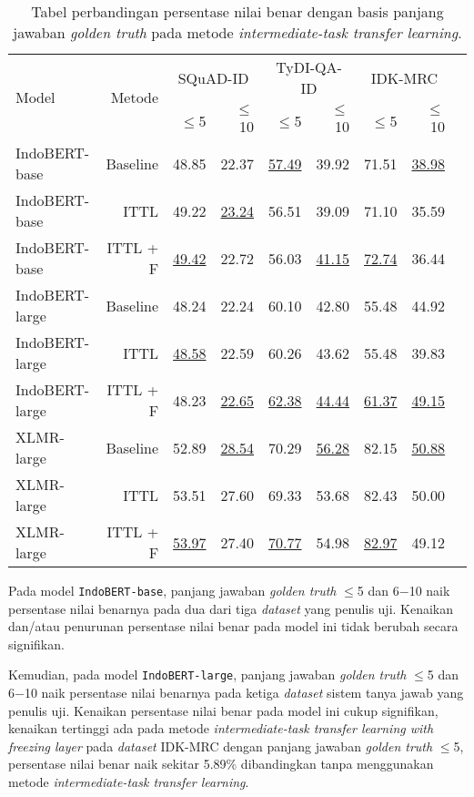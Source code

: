 \begin{table}[H]\centering
\begin{tabular}{lrrrrrrrr}\toprule
\multirow{2}{*}{Model} &\multirow{2}{*}{Metode} &\multicolumn{2}{c}{SQuAD-ID} &\multicolumn{2}{c}{TyDI-QA-ID} &\multicolumn{2}{c}{IDK-MRC} \\\cmidrule{3-8}
& &$\leq$5 &$\leq$10 &$\leq$5 &$\leq$10 &$\leq$5 &$\leq$10 \\\midrule
IndoBERT-base &Baseline &48.85 &22.37 &\underline{57.49} &39.92 &71.51 &\underline{38.98} \\
IndoBERT-base &ITTL &49.22 &\underline{23.24} &56.51 &39.09 &71.10 &35.59 \\
IndoBERT-base &ITTL + F &\underline{49.42} &22.72 &56.03 &\underline{41.15} &\underline{72.74} &36.44 \\
\hline
IndoBERT-large &Baseline &48.24 &22.24 &60.10 &42.80 &55.48 &44.92 \\
IndoBERT-large &ITTL &\underline{48.58} &22.59 &60.26 &43.62 &55.48 &39.83 \\
IndoBERT-large &ITTL + F &48.23 &\underline{22.65} &\underline{62.38} &\underline{44.44} &\underline{61.37} &\underline{49.15} \\
\hline
XLMR-large &Baseline &52.89 &\underline{28.54} &70.29 &\underline{56.28} &82.15 &\underline{50.88} \\
XLMR-large &ITTL &53.51 &27.60 &69.33 &53.68 &82.43 &50.00 \\
XLMR-large &ITTL + F &\underline{53.97} &27.40 &\underline{70.77} &54.98 &\underline{82.97} &49.12 \\
\bottomrule
\end{tabular}
\caption{Tabel perbandingan persentase nilai benar dengan basis panjang jawaban \emph{golden truth} pada metode \emph{intermediate-task transfer learning}.}
\end{table}

Pada model \texttt{IndoBERT-base}, panjang jawaban \emph{golden truth} $\leq$5 dan 6$-$10 naik persentase nilai benarnya pada dua dari tiga \emph{dataset} yang penulis uji. Kenaikan dan/atau penurunan persentase nilai benar pada model ini tidak berubah secara signifikan.

Kemudian, pada model \texttt{IndoBERT-large}, panjang jawaban \emph{golden truth} $\leq$5 dan 6$-$10 naik persentase nilai benarnya pada ketiga \emph{dataset} sistem tanya jawab yang penulis uji. Kenaikan persentase nilai benar pada model ini cukup signifikan, kenaikan tertinggi ada pada metode \emph{intermediate-task transfer learning with freezing layer} pada \emph{dataset} IDK-MRC dengan panjang jawaban \emph{golden truth} $\leq$5, persentase nilai benar naik sekitar 5.89\% dibandingkan tanpa menggunakan metode \emph{intermediate-task transfer learning}.

